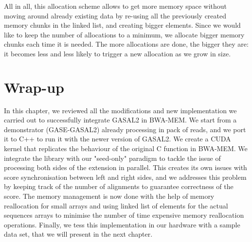 All in all, this allocation scheme allows to get more memory space without moving around already existing data by re-using all the previously created memory chunks in the linked list, and creating bigger elements. Since we would like to keep the number of allocations to a minimum, we allocate bigger memory chunks each time it is needed. The more allocations are done, the bigger they are: it becomes less and less likely to trigger a new allocation as we grow in size.

\section*{Wrap-up}
In this chapter, we reviewed all the modifications and new implementation we carried out to successfully integrate GASAL2 in BWA-MEM. We start from a demonstrator (GASE-GASAL2) already processing in pack of reads, and we port it to C++ to run it with the newer version of GASAL2. We create a CUDA kernel that replicates the behaviour of the original C function in BWA-MEM. We integrate the library with our "seed-only" paradigm to tackle the issue of processing both sides of the extension in parallel. This creates its own issues with score synchronisation between left and right sides, and we addresses this problem by keeping track of the number of alignments to guarantee correctness of the score. The memory management is now done with the help of memory reallocation for small arrays and using linked list of elements for the actual sequences arrays to minimise the number of time expensive memory reallocation operations. Finally, we tess this implementation in our hardware with a sample data set, that we will present in the next chapter.


